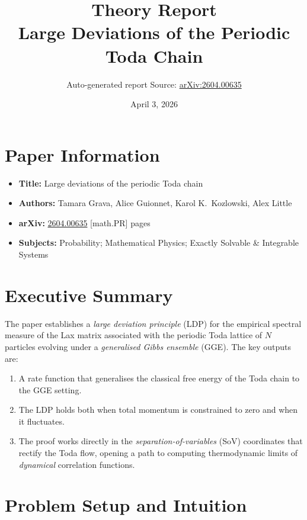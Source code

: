 \documentclass[11pt,a4paper]{article}
\title{\vspace{-1.5cm}\textbf{Theory Report}\\[6pt]
\large Large Deviations of the Periodic Toda Chain}
\author{Auto-generated report \;\textbullet\; Source: \href{https://arxiv.org/abs/2604.00635}{arXiv:2604.00635}}
\date{April 3, 2026}
\theoremstyle{remark}
\begin{document}
\maketitle
\thispagestyle{empty}

\section{Paper Information}
\begin{itemize}[nosep]
  \item \textbf{Title:} Large deviations of the periodic Toda chain
  \item \textbf{Authors:} Tamara Grava, Alice Guionnet, Karol K.\ Kozlowski, Alex Little
  \item \textbf{arXiv:} \href{https://arxiv.org/abs/2604.00635}{2604.00635} [math.PR] \;\textbullet{} pages
  \item \textbf{Subjects:} Probability; Mathematical Physics; Exactly Solvable \& Integrable Systems
\end{itemize}

\section{Executive Summary}
The paper establishes a \emph{large deviation principle} (LDP) for the empirical spectral measure of the Lax matrix associated with the periodic Toda lattice of $N$ particles evolving under a \emph{generalised Gibbs ensemble} (GGE).
The key outputs are:
\begin{enumerate}[nosep]
  \item A rate function that generalises the classical free energy of the Toda chain to the GGE setting.
  \item The LDP holds both when total momentum is constrained to zero and when it fluctuates.
  \item The proof works directly in the \emph{separation-of-variables} (SoV) coordinates that rectify the Toda flow, opening a path to computing thermodynamic limits of \emph{dynamical} correlation functions.
\end{enumerate}

\section{Problem Setup and Intuition}
\end{document}

